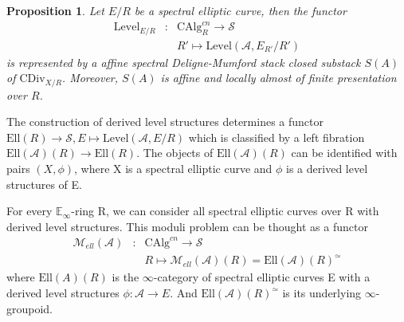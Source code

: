 \documentclass[12pt]{article}
\newtheorem{proposition}[theorem]{Proposition}
\theoremstyle{thry}
\def  \CAlg     {\mathrm{CAlg}}
\def  \CDiv     {\mathrm{CDiv}}
\def  \Ell      {\mathrm{Ell}}
\def  \Level    {\mathrm{Level}}
\def  \ca       {\mathcal{A}}
\def  \cm       {\mathcal{M}}
\def  \cs       {\mathcal{S}}
\def  \be       {\mathbb{E}}
\begin{document}
\begin{proposition}\cite{Ma2023}
	Let $E/R$ be a spectral elliptic curve, then the functor
	\begin{eqnarray*}
		\Level_{E/R} & :& \CAlg_R^{cn} \to \cs  \\
		&  &	R' \mapsto \Level(\ca , E_{R'}/R')
	\end{eqnarray*}
	is represented by a    affine spectral Deligne-Mumford stack closed substack $S(A)$ of $\CDiv_{X/R}$. Moreover, $S(A)$ is affine and locally almost of finite presentation over $R$. 
\end{proposition}


The construction of derived level structures determines a functor $\Ell(R) \to \cs, E \mapsto   \Level(\ca, E/R)$ which is classified by a left fibration $\Ell(\ca)(R) \to \Ell(R)$. The objects of $\Ell(\ca)(R)$ can be identified with pairs $(X, \phi)$, where X is a spectral elliptic curve and $\phi$ is a derived level structures of E.

For every $\be_{\infty}$-ring R, we can consider all spectral elliptic curves  over R with derived level structures. This moduli problem can be thought as a functor
\begin{eqnarray*}
	\cm_{ell}(\ca) & : &\CAlg^{cn} \to    \cs  \\	                       
	&  & R  \longmapsto    \cm_{ell}(\ca)(R) = \Ell(\ca)(R)^{\simeq}   
\end{eqnarray*}
where $ \Ell(A)(R)$ is the $\infty$-category of spectral elliptic curves E with a derived level structures $\phi:  \ca  \to E$. And  $\Ell(\ca)(R)^{\simeq}$ is its underlying $\infty$-groupoid. 
\end{document}

